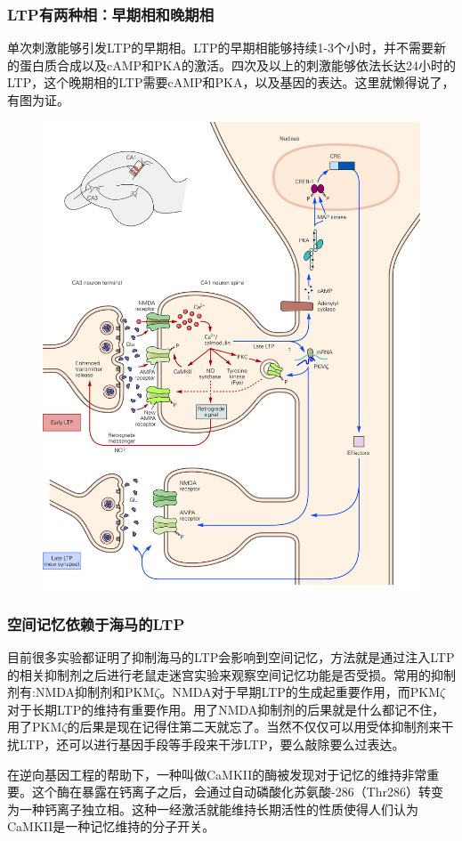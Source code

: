 \documentclass[UTF8,nofonts]{ctexart}
\begin{document}
\subsubsection{LTP有两种相：早期相和晚期相}
单次刺激能够引发LTP的早期相。LTP的早期相能够持续1-3个小时，并不需要新的蛋白质合成以及cAMP和PKA的激活。四次及以上的刺激能够依法长达24小时的LTP，这个晚期相的LTP需要cAMP和PKA，以及基因的表达。这里就懒得说了，有图为证。
\begin{figure}[h]
	\centering
	\includegraphics[scale=0.8]{Pic/6709_PNS5.jpg}
\end{figure}
\subsubsection{空间记忆依赖于海马的LTP}
目前很多实验都证明了抑制海马的LTP会影响到空间记忆，方法就是通过注入LTP的相关抑制剂之后进行老鼠走迷宫实验来观察空间记忆功能是否受损。常用的抑制剂有:NMDA抑制剂和PKM$\zeta$。NMDA对于早期LTP的生成起重要作用，而PKM$\zeta$对于长期LTP的维持有重要作用。用了NMDA抑制剂的后果就是什么都记不住，用了PKM$\zeta$的后果是现在记得住第二天就忘了。当然不仅仅可以用受体抑制剂来干扰LTP，还可以进行基因手段等手段来干涉LTP，要么敲除要么过表达。
\par
在逆向基因工程的帮助下，一种叫做CaMKII的酶被发现对于记忆的维持非常重要。这个酶在暴露在钙离子之后，会通过自动磷酸化苏氨酸-286（Thr286）转变为一种钙离子独立相。这种一经激活就能维持长期活性的性质使得人们认为CaMKII是一种记忆维持的分子开关。
\end{document}
